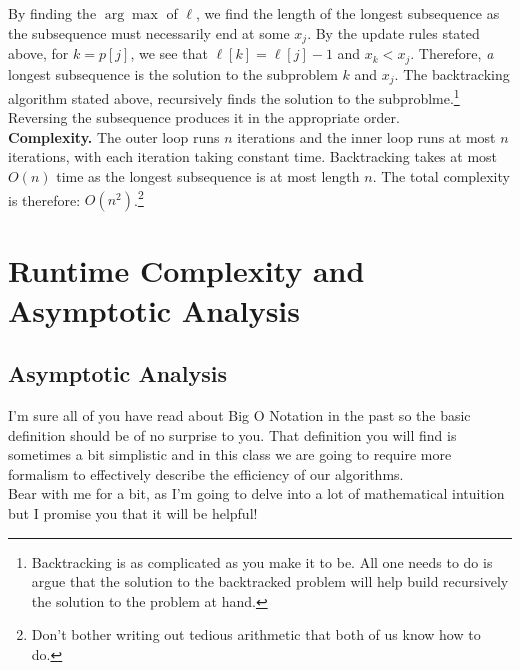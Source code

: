 \documentclass[11pt]{article}
\theoremstyle{plain}
\theoremstyle{definition}
\numberwithin{equation}{section}
\numberwithin{figure}{section}
\begin{document}
\noindent By finding the $\arg \max$ of $\ell$, we find the length of the longest subsequence as the subsequence must necessarily end at some $x_j$. By the update rules stated above, for $k = p[j]$, we see that $\ell[k] = \ell[j] - 1$ and $x_k < x_j$. Therefore, \emph{a} longest subsequence is the solution to the subproblem $k$ and $x_j$. The backtracking algorithm stated above, recursively finds the solution to the subproblme.\footnote{Backtracking is as complicated as you make it to be. All one needs to do is argue that the solution to the backtracked problem will help build recursively the solution to the problem at hand.} Reversing the subsequence produces it in the appropriate order. \\

\noindent \textbf{Complexity.} The outer loop runs $n$ iterations and the inner loop runs at most $n$ iterations, with each iteration taking constant time. Backtracking takes at most $O(n)$ time as the longest subsequence is at most length $n$. The total complexity is therefore: $O(n^2)$.\footnote{Don't bother writing out tedious arithmetic that both of us know how to do.}










\newpage
\section{Runtime Complexity and Asymptotic Analysis}
\subsection{Asymptotic Analysis}
I'm sure all of you have read about Big O Notation in the past so the basic definition should be of no surprise to you. That definition you will find is sometimes a bit simplistic and in this class we are going to require more formalism to effectively describe the efficiency of our algorithms. \\

\noindent Bear with me for a bit, as I'm going to delve into a lot of mathematical intuition but I promise you that it will be helpful! \\
\end{document}
